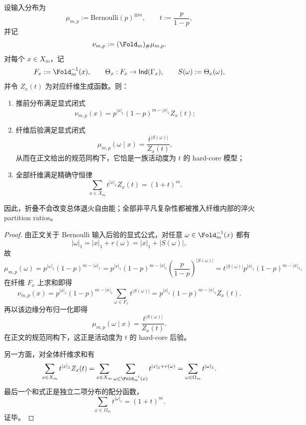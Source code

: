 \begin{theorem}\label{thm:conclusion-fold-fiber-hardcore-annealed-conservation}
设输入分布为
\[
\mu_{m,p}:=\mathrm{Bernoulli}(p)^{\otimes m},
\qquad
t:=\frac{p}{1-p},
\]
并记
\[
\nu_{m,p}:=(\Fold_m)_\#\mu_{m,p}.
\]
对每个 \(x\in X_m\)，记
\[
F_x:=\Fold_m^{-1}(x),\qquad
\Theta_x:F_x\to \mathsf{Ind}(\Gamma_x),
\qquad
S(\omega):=\Theta_x(\omega),
\]
并令 \(Z_x(t)\) 为对应纤维生成函数。则：
\begin{enumerate}
  \item 推前分布满足显式闭式
  \[
  \nu_{m,p}(x)=p^{|x|_1}(1-p)^{m-|x|_1}Z_x(t);
  \]
  \item 纤维后验满足显式闭式
  \[
  \mu_{m,p}(\omega\mid x)=\frac{t^{|S(\omega)|}}{Z_x(t)},
  \]
  从而在正文给出的规范同构下，它恰是一族活动度为 \(t\) 的 hard-core 模型；
  \item 全部纤维满足精确守恒律
  \[
  \boxed{\;
  \sum_{x\in X_m} t^{|x|_1}Z_x(t)=(1+t)^m.\;}
  \]
\end{enumerate}
因此，折叠不会改变总体退火自由能；全部非平凡复杂性都被推入纤维内部的淬火 partition ratios。
\end{theorem}
\begin{proof}
由正文关于 Bernoulli 输入后验的显式公式，对任意 \(\omega\in\Fold_m^{-1}(x)\) 都有
\[
|\omega|_1=|x|_1+r(\omega)=|x|_1+|S(\omega)|,
\]
故
\[
\mu_{m,p}(\omega)
=
p^{|\omega|_1}(1-p)^{m-|\omega|_1}
=
p^{|x|_1}(1-p)^{m-|x|_1}
\left(\frac{p}{1-p}\right)^{|S(\omega)|}
=
t^{|S(\omega)|}p^{|x|_1}(1-p)^{m-|x|_1}.
\]
在纤维 \(F_x\) 上求和即得
\[
\nu_{m,p}(x)=p^{|x|_1}(1-p)^{m-|x|_1}\sum_{\omega\in F_x}t^{|S(\omega)|}
=p^{|x|_1}(1-p)^{m-|x|_1}Z_x(t).
\]
再以该边缘分布归一化即得
\[
\mu_{m,p}(\omega\mid x)=\frac{t^{|S(\omega)|}}{Z_x(t)}.
\]
在正文的规范同构下，这正是活动度为 \(t\) 的 hard-core 后验。

另一方面，对全体纤维求和有
\[
\sum_{x\in X_m} t^{|x|_1}Z_x(t)
=
\sum_{x\in X_m}\sum_{\omega\in \Fold_m^{-1}(x)} t^{|x|_1+r(\omega)}
=
\sum_{\omega\in\Omega_m} t^{|\omega|_1}.
\]
最后一个和式正是独立二项分布的配分函数，
\[
\sum_{\omega\in\Omega_m} t^{|\omega|_1}=(1+t)^m.
\]
证毕。
\end{proof}
